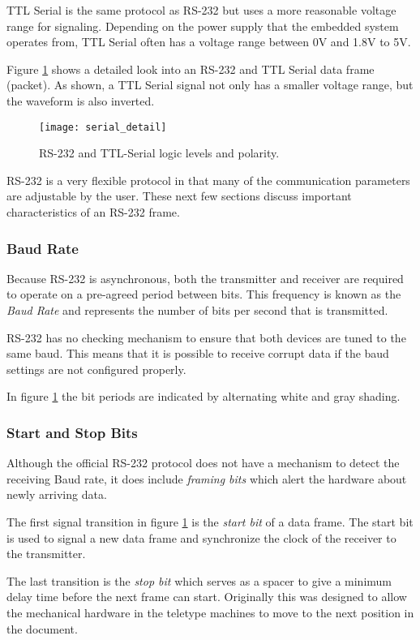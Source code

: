 \documentclass[openany,11pt,fleqn]{book} %
\begin{document}
TTL Serial is the same protocol as RS-232 but uses a more reasonable voltage range for signaling. Depending on the power supply that the embedded system operates from, TTL Serial often has a voltage range between 0V and 1.8V to 5V. 

Figure \ref{serial_detail} shows a detailed look into an RS-232 and TTL Serial data frame (packet). As shown, a TTL Serial signal not only has a smaller voltage range, but the waveform is also inverted. 

\begin{figure}[]
    \centering\texttt{[image: serial\_detail]}
    \caption{RS-232 and TTL-Serial logic levels and polarity.}
    \label{serial_detail}
\end{figure}

RS-232 is a very flexible protocol in that many of the communication parameters are adjustable by the user. These next few sections discuss important characteristics of an RS-232 frame.  

\subsubsection{Baud Rate} 
Because RS-232 is asynchronous, both the transmitter and receiver are required to operate on a pre-agreed period between bits. This frequency is known as the \textit{Baud Rate} and represents the number of bits per second that is transmitted. 

RS-232 has no checking mechanism to ensure that both devices are tuned to the same baud. This means that it is possible to receive corrupt data if the baud settings are not configured properly. 

In figure \ref{serial_detail} the bit periods are indicated by alternating white and gray shading. 

\subsubsection{Start and Stop Bits}
Although the official RS-232 protocol does not have a mechanism to detect the receiving Baud rate, it does include \textit{framing bits} which alert the hardware about newly arriving data. 

The first signal transition in figure \ref{serial_detail} is the \textit{start bit} of a data frame. The start bit is used to signal a new data frame and synchronize the clock of the receiver to the transmitter.   

The last transition is the \textit{stop bit} which serves as a spacer to give a minimum delay time before the next frame can start. Originally this was designed to allow the mechanical hardware in the teletype machines to move to the next position in the document.
\end{document}
